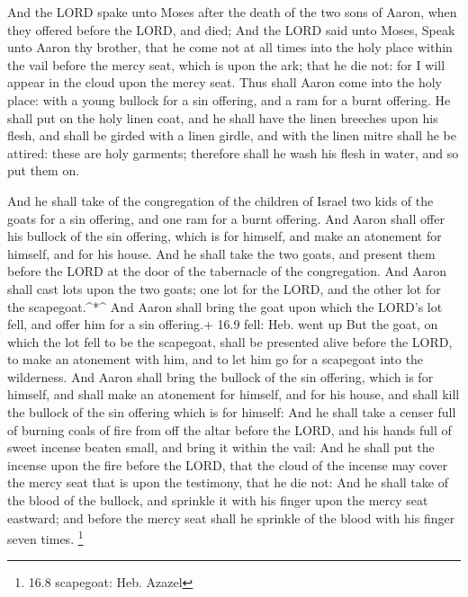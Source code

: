  And the LORD spake unto Moses after the death of the two
sons of Aaron, when they offered before the LORD, and died; 
And the LORD said unto Moses, Speak unto Aaron thy brother, that he come
not at all times into the holy place within the vail before the mercy
seat, which is upon the ark; that he die not: for I will appear in the
cloud upon the mercy seat.  Thus shall Aaron come into the
holy place: with a young bullock for a sin offering, and a ram for a
burnt offering.  He shall put on the holy linen coat, and he
shall have the linen breeches upon his flesh, and shall be girded with a
linen girdle, and with the linen mitre shall he be attired: these are
holy garments; therefore shall he wash his flesh in water, and so put
them on.

 And he shall take of the congregation of the children of
Israel two kids of the goats for a sin offering, and one ram for a burnt
offering.  And Aaron shall offer his bullock of the sin
offering, which is for himself, and make an atonement for himself, and
for his house.  And he shall take the two goats, and present
them before the LORD at the door of the tabernacle of the congregation.
 And Aaron shall cast lots upon the two goats; one lot for
the LORD, and the other lot for the scapegoat.\^{}*\^{}  And
Aaron shall bring the goat upon which the LORD's lot fell, and offer him
for a sin offering.+ 16.9 fell: Heb. went up  But the goat,
on which the lot fell to be the scapegoat, shall be presented alive
before the LORD, to make an atonement with him, and to let him go for a
scapegoat into the wilderness.  And Aaron shall bring the
bullock of the sin offering, which is for himself, and shall make an
atonement for himself, and for his house, and shall kill the bullock of
the sin offering which is for himself:  And he shall take a
censer full of burning coals of fire from off the altar before the LORD,
and his hands full of sweet incense beaten small, and bring it within
the vail:  And he shall put the incense upon the fire
before the LORD, that the cloud of the incense may cover the mercy seat
that is upon the testimony, that he die not:  And he shall
take of the blood of the bullock, and sprinkle it with his finger upon
the mercy seat eastward; and before the mercy seat shall he sprinkle of
the blood with his finger seven times. \footnote{16.8 scapegoat: Heb.
  Azazel}

